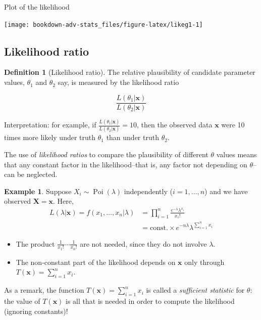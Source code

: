 \documentclass[
]{book}
\providecommand{\tightlist}{%
  \setlength{\itemsep}{0pt}\setlength{\parskip}{0pt}}
\newcommand{\bx}{{\boldsymbol x}}
\newcommand{\bX}{{\boldsymbol X}}
\DeclareMathOperator{\Pois}{Poi}
\newcommand{\const}{\text{const.}}
\theoremstyle{definition}
\newtheorem{definition}{Definition}[chapter]
\theoremstyle{definition}
\newtheorem{example}{Example}[chapter]
\theoremstyle{definition}
\theoremstyle{definition}
\theoremstyle{remark}
\begin{document}
Plot of the likelihood

\begin{center}\texttt{[image: bookdown-adv-stats\_files/figure-latex/likeg1-1]} \end{center}

\hypertarget{likelihood-ratio}{%
\subsection{Likelihood ratio}\label{likelihood-ratio}}

\begin{definition}[Likelihood ratio]
The relative plausibility of candidate parameter values, \(\theta_1\) and \(\theta_2\) say, is measured by the likelihood ratio

\[
\frac{L(\theta_1|\bx)}{L(\theta_2|\bx)}
\]
\end{definition}

Interpretation: for example, if \(\frac{L(\theta_1|\bx)}{L(\theta_2|\bx)} = 10\), then the observed data \(\bx\) were 10 times more likely under truth \(\theta_1\) than under truth \(\theta_2\).

The use of \emph{likelihood ratios} to compare the plausibility of different \(\theta\) values means that any constant factor in the likelihood--that is, any factor not depending on \(\theta\)--can be neglected.

\begin{example}

Suppose \(X_i\sim\Pois(\lambda)\) independently (\(i=1,\dots,n\)) and we have observed \(\bX=\bx\).
Here,
\begin{align*}
L(\lambda|\bx) = f(x_1,\dots,x_n|\lambda)
&= \prod_{i=1}^n \frac{e^{-\lambda}\lambda^{x_i}}{x_i!} \\
&= \const \times e^{-n\lambda}\lambda^{\sum_{i=1}^n x_i}
\end{align*}

\begin{itemize}
\tightlist
\item
  The product \(\frac{1}{x_1!}\cdots \frac{1}{x_n!}\) are not needed, since they do not involve \(\lambda\).
\item
  The non-constant part of the likelihood depends on \(\bx\) only through \(T(\bx)=\sum_{i=1}^n x_i\).
\end{itemize}

\end{example}

As a remark, the function \(T(\bx)=\sum_{i=1}^n x_i\) is called a \emph{sufficient statistic} for \(\theta\): the value of \(T(\bx)\) is all that is needed in order to compute the likelihood (ignoring constants)!
\end{document}
